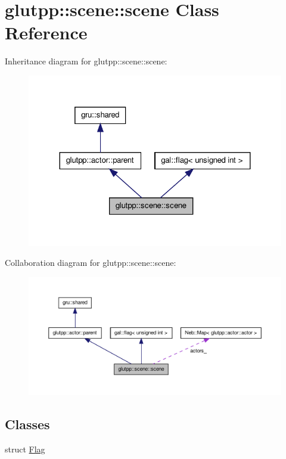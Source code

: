 \hypertarget{classglutpp_1_1scene_1_1scene}{\section{glutpp\-:\-:scene\-:\-:scene \-Class \-Reference}
\label{classglutpp_1_1scene_1_1scene}
}


\-Inheritance diagram for glutpp\-:\-:scene\-:\-:scene\-:
\nopagebreak
\begin{figure}[H]
\begin{center}
\leavevmode
\includegraphics[width=324pt]{classglutpp_1_1scene_1_1scene__inherit__graph}
\end{center}
\end{figure}


\-Collaboration diagram for glutpp\-:\-:scene\-:\-:scene\-:
\nopagebreak
\begin{figure}[H]
\begin{center}
\leavevmode
\includegraphics[width=350pt]{classglutpp_1_1scene_1_1scene__coll__graph}
\end{center}
\end{figure}
\subsection*{\-Classes}
\begin{DoxyCompactItemize}
\item 
struct \hyperlink{structglutpp_1_1scene_1_1scene_1_1Flag}{\-Flag}
\end{DoxyCompactItemize}
